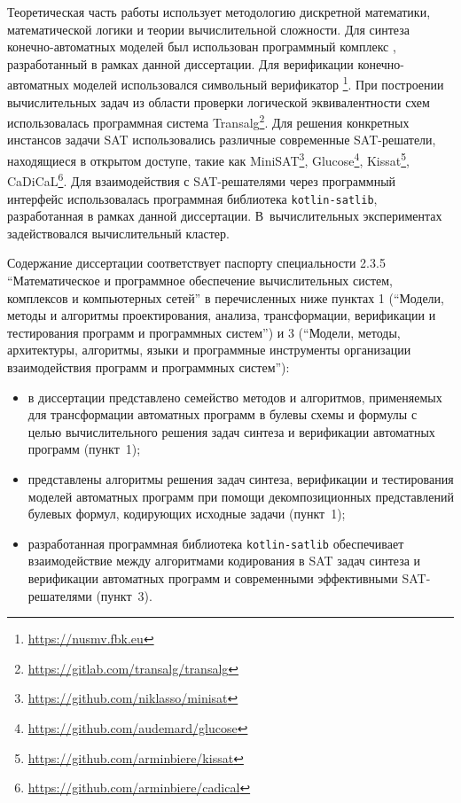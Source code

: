 \methods
%
Теоретическая часть работы использует методологию дискретной математики, математической логики и теории вычислительной сложности.
Для синтеза конечно-автоматных моделей был использован программный комплекс , разработанный в рамках данной диссертации.
Для верификации конечно-автоматных моделей использовался символьный верификатор \footnote{\url{https://nusmv.fbk.eu}}.
При построении вычислительных задач из области проверки логической эквивалентности схем использовалась программная система Transalg\footnote{\url{https://gitlab.com/transalg/transalg}}.
Для решения конкретных инстансов задачи SAT использовались различные современные SAT-решатели, находящиеся в открытом доступе, такие как MiniSAT\footnote{\url{https://github.com/niklasso/minisat}}, Glucose\footnote{\url{https://github.com/audemard/glucose}}, Kissat\footnote{\url{https://github.com/arminbiere/kissat}}, CaDiCaL\footnote{\url{https://github.com/arminbiere/cadical}}.
Для взаимодействия с SAT-решателями через программный интерфейс использовалась программная библиотека \texttt{kotlin-satlib}, разработанная в рамках данной диссертации.
В~вычислительных экспериментах задействовался вычислительный кластер.


\relevance
%
Содержание диссертации соответствует паспорту специальности 2.3.5 \enquote{Математическое и программное обеспечение вычислительных систем, комплексов и компьютерных сетей} в перечисленных ниже пунктах 1 (\enquote{Модели, методы и алгоритмы проектирования, анализа, трансформации, верификации и тестирования программ и программных систем}) и 3 (\enquote{Модели, методы, архитектуры, алгоритмы, языки и программные инструменты организации взаимодействия программ и программных систем}):
\begin{itemize}[beginpenalty=10000]
    \item в диссертации представлено семейство методов и алгоритмов, применяемых для трансформации автоматных программ в булевы схемы и формулы с целью вычислительного решения задач синтеза и верификации автоматных программ (пункт~1);
    \item представлены алгоритмы решения задач синтеза, верификации и тестирования моделей автоматных программ при помощи декомпозиционных представлений булевых формул, кодирующих исходные задачи (пункт~1);
    \item разработанная программная библиотека \texttt{kotlin-satlib} обеспечивает взаимодействие между алгоритмами кодирования в SAT задач синтеза и верификации автоматных программ и современными эффективными SAT-решателями (пункт~3).
\end{itemize}


